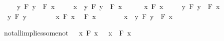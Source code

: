 \begin{isabellebody}
\isanewline
\ \ \isamarkupfalse%
\ {\isachardoublequoteopen}{\isacharparenleft}{\isasymexists}\ y{\isachardot}\ F\ y{\isacharparenright}\ {\isasymlongrightarrow}\ F\ x{\isachardoublequoteclose}\isacommand{{\isachardot}{\isachardot}}\isamarkupfalse%
\isanewline
\ \ \isamarkupfalse%
\ {\isachardoublequoteopen}{\isasymexists}\ x{\isachardot}\ {\isacharparenleft}{\isasymexists}\ y{\isachardot}\ F\ y{\isacharparenright}\ {\isasymlongrightarrow}\ F\ x{\isachardoublequoteclose}\isacommand{{\isachardot}{\isachardot}}\isamarkupfalse%
\isanewline
{}\isamarkupfalse%
\isanewline
\ \ \isamarkupfalse%
\ {\isachardoublequoteopen}{\isasymnot}\ {\isacharparenleft}{\isasymexists}\ x{\isachardot}\ F\ x{\isacharparenright}{\isachardoublequoteclose}\isanewline
\ \ \isamarkupfalse%
\ {\isachardoublequoteopen}{\isacharparenleft}{\isasymexists}\ y{\isachardot}\ F\ y{\isacharparenright}\ {\isasymlongrightarrow}\ F\ x{\isachardoublequoteclose}\isanewline
\ \ \isamarkupfalse%
\isanewline
\ \ \ \ \isamarkupfalse%
\ {\isachardoublequoteopen}{\isasymexists}\ y{\isachardot}\ F\ y{\isachardoublequoteclose}\isanewline
\ \ \ \ \isamarkupfalse%
\ {\isacharbackquoteopen}{\isasymnot}\ {\isacharparenleft}{\isasymexists}\ x{\isachardot}\ F\ x{\isacharparenright}{\isacharbackquoteclose}\ \isamarkupfalse%
\ {\isachardoublequoteopen}F\ x{\isachardoublequoteclose}\isacommand{{\isachardot}{\isachardot}}\isamarkupfalse%
\isanewline
\ \ \isamarkupfalse%
\isanewline
\ \ \isamarkupfalse%
\ {\isachardoublequoteopen}{\isasymexists}\ x{\isachardot}\ {\isacharparenleft}{\isasymexists}\ y{\isachardot}\ F\ y{\isacharparenright}\ {\isasymlongrightarrow}\ F\ x{\isachardoublequoteclose}\isacommand{{\isachardot}{\isachardot}}\isamarkupfalse%
\isanewline
{}\isamarkupfalse%
%
\endisatagproof
{\isafoldproof}%
%
\isadelimproof
%
\endisadelimproof
%
\begin{isamarkuptext}%
\begin{Answer}[ref = demorgan] \end{Answer}%
\end{isamarkuptext}\isamarkuptrue%
\isamarkupfalse%
\ not{\isacharunderscore}all{\isacharunderscore}implies{\isacharunderscore}some{\isacharunderscore}not{\isacharcolon}\ {\isachardoublequoteopen}{\isasymnot}\ {\isacharparenleft}{\isasymforall}\ x{\isachardot}\ F\ x{\isacharparenright}\ {\isasymlongrightarrow}\ {\isacharparenleft}{\isasymexists}\ x{\isachardot}\ {\isasymnot}\ F\ x{\isacharparenright}{\isachardoublequoteclose}\isanewline

\end{isabellebody}
